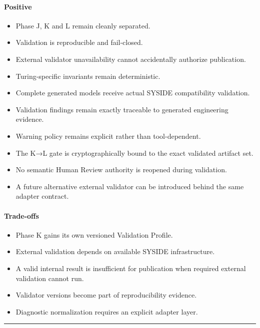 \hypertarget{positive-1}{%
\paragraph{Positive}\label{positive-1}}

\begin{itemize}
\tightlist
\item
  Phase J, K and L remain cleanly separated.
\item
  Validation is reproducible and fail-closed.
\item
  External validator unavailability cannot accidentally authorize publication.
\item
  Turing-specific invariants remain deterministic.
\item
  Complete generated models receive actual SYSIDE compatibility validation.
\item
  Validation findings remain exactly traceable to generated engineering evidence.
\item
  Warning policy remains explicit rather than tool-dependent.
\item
  The K→L gate is cryptographically bound to the exact validated artifact set.
\item
  No semantic Human Review authority is reopened during validation.
\item
  A future alternative external validator can be introduced behind the same adapter contract.
\end{itemize}

\hypertarget{trade-offs-4}{%
\paragraph{Trade-offs}\label{trade-offs-4}}

\begin{itemize}
\tightlist
\item
  Phase K gains its own versioned Validation Profile.
\item
  External validation depends on available SYSIDE infrastructure.
\item
  A valid internal result is insufficient for publication when required external validation cannot run.
\item
  Validator versions become part of reproducibility evidence.
\item
  Diagnostic normalization requires an explicit adapter layer.
\end{itemize}

\begin{center}\rule{0.5\linewidth}{0.5pt}\end{center}

